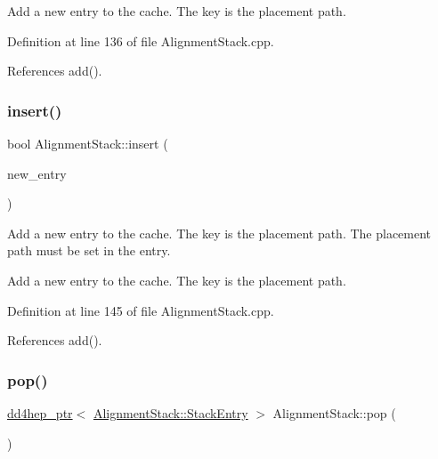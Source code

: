 Add a new entry to the cache. The key is the placement path. 



Definition at line 136 of file Alignment\+Stack.\+cpp.



References add().

\hypertarget{class_d_d4hep_1_1_alignments_1_1_alignment_stack_aefce20c233a0ad85d6a5c54ac2fb43b7}{}\label{class_d_d4hep_1_1_alignments_1_1_alignment_stack_aefce20c233a0ad85d6a5c54ac2fb43b7} 
\subsubsection{\texorpdfstring{insert()}{insert()}\hspace{0.1cm}{\footnotesize\ttfamily [2/2]}}
{\footnotesize\ttfamily bool Alignment\+Stack\+::insert (\begin{DoxyParamCaption}\item[{\hyperlink{class_d_d4hep_1_1dd4hep__ptr}{dd4hep\+\_\+ptr}$<$ \hyperlink{struct_d_d4hep_1_1_alignments_1_1_alignment_stack_1_1_stack_entry}{Stack\+Entry} $>$ \&}]{new\+\_\+entry }\end{DoxyParamCaption})}



Add a new entry to the cache. The key is the placement path. The placement path must be set in the entry. 

Add a new entry to the cache. The key is the placement path. 

Definition at line 145 of file Alignment\+Stack.\+cpp.



References add().

\hypertarget{class_d_d4hep_1_1_alignments_1_1_alignment_stack_aa140239531cbb98a7dde1d8af1f69877}{}\label{class_d_d4hep_1_1_alignments_1_1_alignment_stack_aa140239531cbb98a7dde1d8af1f69877} 
\subsubsection{\texorpdfstring{pop()}{pop()}}
{\footnotesize\ttfamily \hyperlink{class_d_d4hep_1_1dd4hep__ptr}{dd4hep\+\_\+ptr}$<$ \hyperlink{struct_d_d4hep_1_1_alignments_1_1_alignment_stack_1_1_stack_entry}{Alignment\+Stack\+::\+Stack\+Entry} $>$ Alignment\+Stack\+::pop (\begin{DoxyParamCaption}{ }\end{DoxyParamCaption})}



